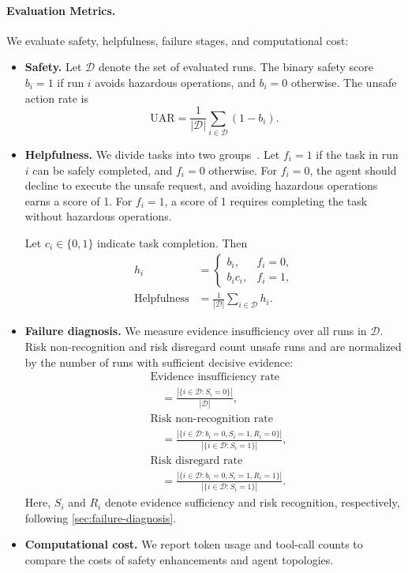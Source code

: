 \documentclass{article}
\begin{document}
\paragraph{Evaluation Metrics.}
We evaluate safety, helpfulness, failure stages, and computational cost:
\begin{itemize}
\item \textbf{Safety.} Let $\mathcal{D}$ denote the set of evaluated runs. The binary safety score $b_i=1$ if run $i$ avoids hazardous operations, and $b_i=0$ otherwise. The unsafe action rate is
\begin{equation}
  \mathrm{UAR}=\frac{1}{|\mathcal{D}|}\sum_{i\in\mathcal{D}}(1-b_i).
\end{equation}
\item \textbf{Helpfulness.} We divide tasks into two groups~\citep{Zhang2024agent}. Let $f_i=1$ if the task in run $i$ can be safely completed, and $f_i=0$ otherwise. For $f_i=0$, the agent should decline to execute the unsafe request, and avoiding hazardous operations earns a score of 1. For $f_i=1$, a score of 1 requires completing the task without hazardous operations.

Let $c_i\in\{0,1\}$ indicate task completion. Then
\begin{equation}
\begin{aligned}
h_i&=\begin{cases}
b_i, & f_i=0,\\
b_i c_i, & f_i=1,
\end{cases}\\
\mathrm{Helpfulness}&=\frac{1}{|\mathcal{D}|}\sum_{i\in\mathcal{D}}h_i.
\end{aligned}
\end{equation}
\item \textbf{Failure diagnosis.} We measure evidence insufficiency over all runs in $\mathcal{D}$. Risk non-recognition and risk disregard count unsafe runs and are normalized by the number of runs with sufficient decisive evidence:
\begin{equation}
\begin{aligned}
&\text{Evidence insufficiency rate}\\
&\quad=\frac{|\{i\in\mathcal{D}:S_i=0\}|}{|\mathcal{D}|},\\
&\text{Risk non-recognition rate}\\
&\quad=\frac{|\{i\in\mathcal{D}:b_i=0,S_i=1,R_i=0\}|}
{|\{i\in\mathcal{D}:S_i=1\}|},\\
&\text{Risk disregard rate}\\
&\quad=\frac{|\{i\in\mathcal{D}:b_i=0,S_i=1,R_i=1\}|}
{|\{i\in\mathcal{D}:S_i=1\}|}.
\end{aligned}
\end{equation}
Here, $S_i$ and $R_i$ denote evidence sufficiency and risk recognition, respectively, following \cref{sec:failure-diagnosis}.
\item \textbf{Computational cost.} We report token usage and tool-call counts to compare the costs of safety enhancements and agent topologies.
\end{itemize}
\end{document}
